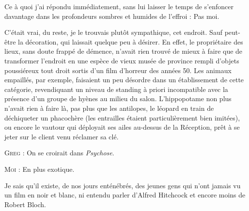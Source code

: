 Ce à quoi j’ai répondu immédiatement, sans lui laisser le temps de s’enfoncer davantage dans les profondeurs sombres et humides de l’effroi : Pas moi.

C’était vrai, du reste, je le trouvais plutôt sympathique, cet endroit. Sauf peut-être la décoration, qui laissait quelque peu à désirer. En effet, le propriétaire des lieux, sans doute frappé de démence, n’avait rien trouvé de mieux à faire que de transformer l’endroit en une espèce de vieux musée de province rempli d’objets poussiéreux tout droit sortis d’un film d’horreur des années 50. Les animaux empaillés, par exemple, faisaient un peu désordre dans un établissement de cette catégorie, revendiquant un niveau de standing à priori incompatible avec la présence d’un groupe de hyènes au milieu du salon. L’hippopotame non plus n’avait rien à faire là, pas plus que les antilopes, le léopard en train de déchiqueter un phacochère (les entrailles étaient particulièrement bien imitées), ou encore le vautour qui déployait ses ailes au-dessus de la Réception, prêt à se jeter sur le client venu réclamer sa clé.

\begin{dialogue}

\textsc{Greg} : On se croirait dans \textit{Psychose}.

\textsc{Moi} : En plus exotique.

\end{dialogue}

Je sais qu’il existe, de nos jours enténébrés, des jeunes gens qui n’ont jamais vu un film en noir et blanc, ni entendu parler d’Alfred Hitchcock et encore moins de Robert Bloch.

